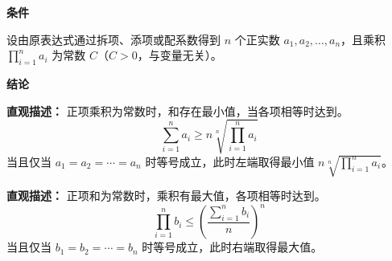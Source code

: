 \begin{statementbox}
	\textbf{\textcolor{CStatement}{条件}}
	\begin{description}[style=nextline, leftmargin=2.8em, labelsep=0.5em, itemsep=0.35em]
		\item[\textbf{\textcolor{CStatement}{条件1（正项乘积常数）：}}]
			设由原表达式通过拆项、添项或配系数得到 $n$ 个正实数 $a_1,a_2,\dots,a_n$，且乘积 $\displaystyle\prod_{i=1}^n a_i$ 为常数 $C$（$C>0$，与变量无关）。
	\end{description}
	\textbf{\textcolor{CStatement}{结论}}
	\begin{description}[style=nextline, leftmargin=2.8em, labelsep=0.5em, itemsep=0.45em]
		\item[\textbf{\textcolor{CStatement}{结论一（和最小公式）：}}]
			\textbf{\textcolor{CStatement}{直观描述：}}
			正项乘积为常数时，和存在最小值，当各项相等时达到。
			\[
				\sum_{i=1}^{n} a_i \ge n\sqrt[n]{\prod_{i=1}^{n} a_i}
			\]
			当且仅当 $a_1=a_2=\cdots=a_n$ 时等号成立，此时左端取得最小值 $n\sqrt[n]{\prod_{i=1}^{n} a_i}$。
		\item[\textbf{\textcolor{CStatement}{推广结论（对偶均值）：}}]
			\textbf{\textcolor{CStatement}{直观描述：}}
			正项和为常数时，乘积有最大值，各项相等时达到。
			\[
				\prod_{i=1}^{n} b_i \le \left(\frac{\sum_{i=1}^{n} b_i}{n}\right)^n
			\]
			当且仅当 $b_1=b_2=\cdots=b_n$ 时等号成立，此时右端取得最大值。
	\end{description}

\end{statementbox}
